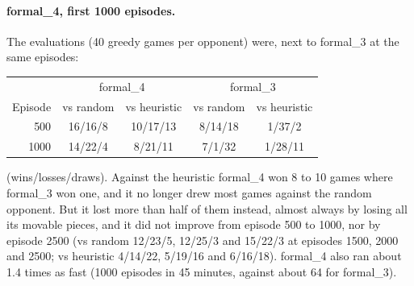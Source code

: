 \paragraph{formal\_4, first 1000 episodes.} The evaluations (40 greedy games per opponent) were,
next to formal\_3 at the same episodes:
\begin{center}
\begin{tabular}{rcccc}
\toprule
 & \multicolumn{2}{c}{formal\_4} & \multicolumn{2}{c}{formal\_3} \\
Episode & vs random & vs heuristic & vs random & vs heuristic \\
\midrule
500  & 16/16/8 & 10/17/13 & 8/14/18 & 1/37/2  \\
1000 & 14/22/4 & 8/21/11  & 7/1/32  & 1/28/11 \\
\bottomrule
\end{tabular}
\end{center}
(wins/losses/draws). Against the heuristic formal\_4 won 8 to 10 games where formal\_3 won one,
and it no longer drew most games against the random opponent. But it lost more than half of them
instead, almost always by losing all its movable pieces, and it did not improve from episode 500
to 1000, nor by episode 2500 (vs random 12/23/5, 12/25/3 and 15/22/3 at episodes 1500, 2000 and
2500; vs heuristic 4/14/22, 5/19/16 and 6/16/18). formal\_4 also ran about 1.4 times as fast (1000 episodes in 45 minutes, against about
64 for formal\_3).

